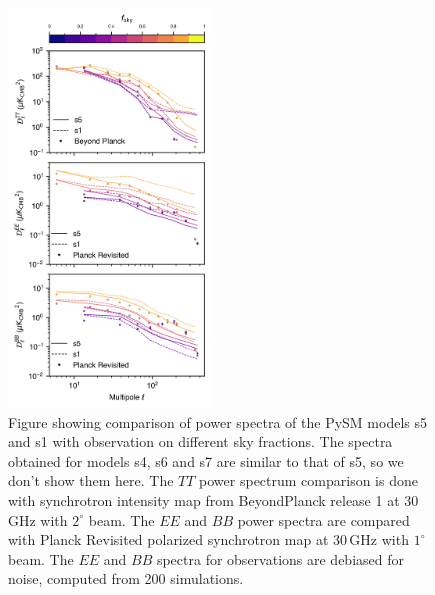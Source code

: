 \documentclass[twocolumn]{aastex631}
\begin{document}
\begin{figure}
   \centering
   \includegraphics[width=0.48\textwidth]{figures/Dlcomp_PySM3-4_s5_vs_BPPR_SYNC.png}
    \caption{Figure showing comparison of power spectra of the PySM models s5 and s1 with observation on different sky fractions. The spectra obtained for models s4, s6 and s7 are similar to that of s5, so we don't show them here. The $TT$ power spectrum comparison is done with synchrotron intensity map from BeyondPlanck release 1 \citep{Andersen:2023} at 30 GHz with $2^\circ$ beam. The $EE$ and $BB$ power spectra are compared with Planck Revisited \citep{Delabrouille:2024} polarized synchrotron map at 30\,GHz with $1^\circ$ beam. The $EE$ and $BB$ spectra for observations are debiased for noise, computed from 200 simulations.}
   \label{fig:Dl_sync_galmask}
\end{figure}
\end{document}
